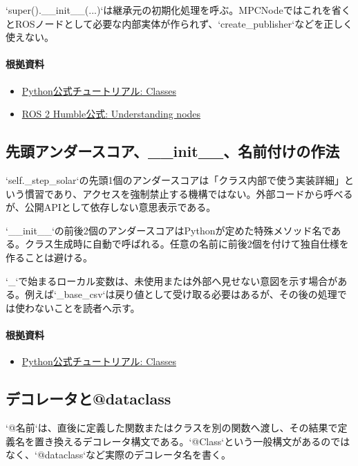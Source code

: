 \documentclass[a4paper,11pt]{article}
\begin{document}
`super().\_\_init\_\_(...)`は継承元の初期化処理を呼ぶ。MPCNodeではこれを省くとROSノードとして必要な内部実体が作られず、`create\_publisher`などを正しく使えない。

\paragraph{根拠資料}
\begin{itemize}[leftmargin=1.6em]
\item \href{https://docs.python.org/3/tutorial/classes.html}{Python公式チュートリアル: Classes}
\item \href{https://docs.ros.org/en/humble/Tutorials/Beginner-CLI-Tools/Understanding-ROS2-Nodes/Understanding-ROS2-Nodes.html}{ROS 2 Humble公式: Understanding nodes}
\end{itemize}

\subsection{先頭アンダースコア、\_\_init\_\_、名前付けの作法}
`self.\_step\_solar`の先頭1個のアンダースコアは「クラス内部で使う実装詳細」という慣習であり、アクセスを強制禁止する機構ではない。外部コードから呼べるが、公開APIとして依存しない意思表示である。


`\_\_init\_\_`の前後2個のアンダースコアはPythonが定めた特殊メソッド名である。クラス生成時に自動で呼ばれる。任意の名前に前後2個を付けて独自仕様を作ることは避ける。


`\_`で始まるローカル変数は、未使用または外部へ見せない意図を示す場合がある。例えば`\_base\_csv`は戻り値として受け取る必要はあるが、その後の処理では使わないことを読者へ示す。

\paragraph{根拠資料}
\begin{itemize}[leftmargin=1.6em]
\item \href{https://docs.python.org/3/tutorial/classes.html}{Python公式チュートリアル: Classes}
\end{itemize}

\subsection{デコレータと@dataclass}
`@名前`は、直後に定義した関数またはクラスを別の関数へ渡し、その結果で定義名を置き換えるデコレータ構文である。`@Class`という一般構文があるのではなく、`@dataclass`など実際のデコレータ名を書く。
\end{document}
